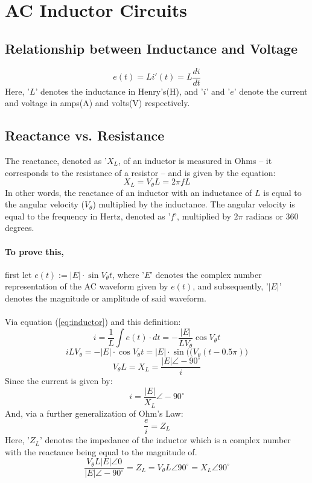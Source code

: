 \documentclass{article}
\begin{document}
	\section[Induction]{AC Inductor Circuits}
	\subsection[Equation]{Relationship between Inductance and Voltage}
	\begin{equation}\label{eq:inductor}
		e(t)=Li'(t)=L\frac{di}{dt}
	\end{equation}
	Here, '$L$' denotes the inductance in Henry's(H), and '$i$' and '$e$' 
	denote the current and voltage in amps(A) and volts(V) respectively.
	\subsection[Reactance]{Reactance vs. Resistance}
	The reactance, denoted as '$X_L$, of an inductor is measured in Ohms -- it 
	corresponds to the resistance of a resistor -- and is given by the equation:
	\begin{equation}\label{eq:reactance}
		X_L=V_\theta L = 2\pi f L
	\end{equation}
	In other words, the reactance of an inductor with an inductance of $L$ is 
	equal to the angular velocity ($V_\theta$) multiplied by the inductance.  
	The angular velocity is equal to the frequency in Hertz, denoted as '$f$', 
	multiplied by 
	$2\pi$ radians or $360$ degrees.
	\paragraph[Proof]{To prove this,} first let $e(t):=|E|\cdot\sin V_\theta 
	t$, where '$E$' denotes the complex number representation of the AC 
	waveform given by $e(t)$, and subsequently, '$|E|$' denotes the magnitude 
	or amplitude of said waveform. \\ \\
	Via equation (\ref{eq:inductor}) and this definition:
	$$ i = \frac{1}{L}\int e(t) \cdot dt = - \frac{|E|}{LV_\theta} \cos 
	V_\theta t$$
	$$ iLV_\theta = - |E|\cdot\cos V_\theta t = |E|\cdot \sin \big((V_\theta 
	(t-0.5\pi)\big) $$
	$$ V_\theta L = X_L = \frac{|E|\angle-90^{\circ}}{i}$$
	Since the current is given by:
	$$ i = \frac{|E|}{X_L}\angle-90^{\circ}$$
	And, via a further generalization of Ohm's Law:
	$$ \frac{e}{i} = Z_L$$
	Here, '$Z_L$' denotes the impedance of the inductor which is a complex 
	number with the reactance being equal to the magnitude of.
	$$ \frac{V_\theta L|E|\angle0}{|E|\angle-90^{\circ}} = Z_L = V_\theta L 
	\angle 90^{\circ} = X_L\angle90^{\circ}$$
\end{document}
